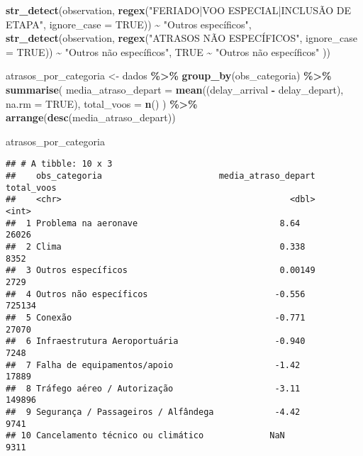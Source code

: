 \documentclass[
]{article}
\newenvironment{Shaded}{\begin{snugshade}}{\end{snugshade}}
\newcommand{\AttributeTok}[1]{\textcolor[rgb]{0.13,0.29,0.53}{#1}}
\newcommand{\ConstantTok}[1]{\textcolor[rgb]{0.56,0.35,0.01}{#1}}
\newcommand{\FunctionTok}[1]{\textcolor[rgb]{0.13,0.29,0.53}{\textbf{#1}}}
\newcommand{\NormalTok}[1]{#1}
\newcommand{\OtherTok}[1]{\textcolor[rgb]{0.56,0.35,0.01}{#1}}
\newcommand{\SpecialCharTok}[1]{\textcolor[rgb]{0.81,0.36,0.00}{\textbf{#1}}}
\newcommand{\StringTok}[1]{\textcolor[rgb]{0.31,0.60,0.02}{#1}}
\begin{document}
\begin{Shaded}
\begin{Highlighting}[]
    \FunctionTok{str\_detect}\NormalTok{(observation, }\FunctionTok{regex}\NormalTok{(}\StringTok{"FERIADO|VOO ESPECIAL|INCLUSÃO DE ETAPA"}\NormalTok{, }\AttributeTok{ignore\_case =} \ConstantTok{TRUE}\NormalTok{)) }\SpecialCharTok{\textasciitilde{}} \StringTok{"Outros específicos"}\NormalTok{,}
    \FunctionTok{str\_detect}\NormalTok{(observation, }\FunctionTok{regex}\NormalTok{(}\StringTok{"ATRASOS NÃO ESPECÍFICOS"}\NormalTok{, }\AttributeTok{ignore\_case =} \ConstantTok{TRUE}\NormalTok{)) }\SpecialCharTok{\textasciitilde{}} \StringTok{"Outros não específicos"}\NormalTok{,}
    \ConstantTok{TRUE} \SpecialCharTok{\textasciitilde{}} \StringTok{"Outros não específicos"}
\NormalTok{  ))}

\NormalTok{atrasos\_por\_categoria }\OtherTok{\textless{}{-}}\NormalTok{ dados }\SpecialCharTok{\%\textgreater{}\%}
  \FunctionTok{group\_by}\NormalTok{(obs\_categoria) }\SpecialCharTok{\%\textgreater{}\%}
  \FunctionTok{summarise}\NormalTok{(}
    \AttributeTok{media\_atraso\_depart =} \FunctionTok{mean}\NormalTok{((delay\_arrival }\SpecialCharTok{{-}}\NormalTok{ delay\_depart), }\AttributeTok{na.rm =} \ConstantTok{TRUE}\NormalTok{),}
    \AttributeTok{total\_voos =} \FunctionTok{n}\NormalTok{()}
\NormalTok{  ) }\SpecialCharTok{\%\textgreater{}\%}
  \FunctionTok{arrange}\NormalTok{(}\FunctionTok{desc}\NormalTok{(media\_atraso\_depart))}

\NormalTok{atrasos\_por\_categoria}
\end{Highlighting}
\end{Shaded}

\begin{verbatim}
## # A tibble: 10 x 3
##    obs_categoria                       media_atraso_depart total_voos
##    <chr>                                             <dbl>      <int>
##  1 Problema na aeronave                            8.64         26026
##  2 Clima                                           0.338         8352
##  3 Outros específicos                              0.00149       2729
##  4 Outros não específicos                         -0.556       725134
##  5 Conexão                                        -0.771        27070
##  6 Infraestrutura Aeroportuária                   -0.940         7248
##  7 Falha de equipamentos/apoio                    -1.42         17889
##  8 Tráfego aéreo / Autorização                    -3.11        149896
##  9 Segurança / Passageiros / Alfândega            -4.42          9741
## 10 Cancelamento técnico ou climático             NaN             9311
\end{verbatim}
\end{document}

